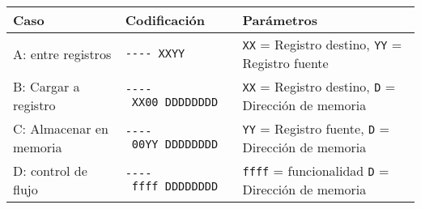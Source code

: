 \documentclass[12pt,twoside]{templates/unerthesis}
\begin{document}
\begin{longtable}[]{@{}lll@{}}
\toprule
\begin{minipage}[b]{0.30\columnwidth}\raggedright
Caso\strut
\end{minipage} & \begin{minipage}[b]{0.30\columnwidth}\raggedright
Codificación\strut
\end{minipage} & \begin{minipage}[b]{0.30\columnwidth}\raggedright
Parámetros\strut
\end{minipage}\tabularnewline
\midrule
\endhead
\begin{minipage}[t]{0.30\columnwidth}\raggedright
A: entre registros\strut
\end{minipage} & \begin{minipage}[t]{0.30\columnwidth}\raggedright
\texttt{-\/-\/-\/-\ XXYY}\strut
\end{minipage} & \begin{minipage}[t]{0.30\columnwidth}\raggedright
\texttt{XX} = Registro destino, \texttt{YY} = Registro fuente\strut
\end{minipage}\tabularnewline
\begin{minipage}[t]{0.30\columnwidth}\raggedright
B: Cargar a registro\strut
\end{minipage} & \begin{minipage}[t]{0.30\columnwidth}\raggedright
\texttt{-\/-\/-\/-\ XX00\ DDDDDDDD}\strut
\end{minipage} & \begin{minipage}[t]{0.30\columnwidth}\raggedright
\texttt{XX} = Registro destino, \texttt{D} = Dirección de memoria\strut
\end{minipage}\tabularnewline
\begin{minipage}[t]{0.30\columnwidth}\raggedright
C: Almacenar en memoria\strut
\end{minipage} & \begin{minipage}[t]{0.30\columnwidth}\raggedright
\texttt{-\/-\/-\/-\ 00YY\ DDDDDDDD}\strut
\end{minipage} & \begin{minipage}[t]{0.30\columnwidth}\raggedright
\texttt{YY} = Registro fuente, \texttt{D} = Dirección de memoria\strut
\end{minipage}\tabularnewline
\begin{minipage}[t]{0.30\columnwidth}\raggedright
D: control de flujo\strut
\end{minipage} & \begin{minipage}[t]{0.30\columnwidth}\raggedright
\texttt{-\/-\/-\/-\ ffff\ DDDDDDDD}\strut
\end{minipage} & \begin{minipage}[t]{0.30\columnwidth}\raggedright
\texttt{ffff} = funcionalidad \texttt{D} = Dirección de memoria\strut
\end{minipage}\tabularnewline
\bottomrule
\end{longtable}
\end{document}
